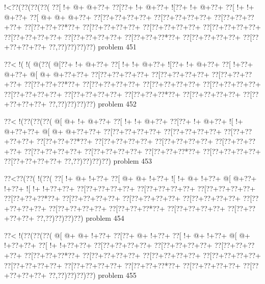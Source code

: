 \vbox{\vbox{\goo
\- !<\0??(\0??(\0??(\0??(
\0??[\- !+\- @+\- @+\0??+
\0??[\0??+\- !+\- @+\0??+
\- ![\0??+\- !+\- @+\0??+
\0??[\- !+\- !+\- @+\0??+
\0??[\- @+\- @+\- @+\0??+
\0??[\0??+\0??+\0??+\0??+
\0??[\0??+\0??+\0??+\0??+
\0??[\0??+\0??+\0??+\0??+
\0??[\0??+\0??+\0??*\0??+
\0??[\0??+\0??+\0??+\0??+
\0??[\0??+\0??+\0??+\0??+
\0??[\0??+\0??+\0??+\0??+
\0??[\0??+\0??+\0??+\0??+
\0??[\0??+\0??+\0??+\0??+
\0??[\0??+\0??+\0??*\0??+
\0??[\0??+\0??+\0??+\0??+
\0??[\0??+\0??+\0??+\0??+
\0??,\0??)\0??)\0??)\0??)
}
\hfil problem 451\hfil\break
}

\vbox{\vbox{\goo
\0??<\- !(\- !(\- @(\0??(
\- @[\0??+\- !+\- @+\0??+
\0??[\- !+\- !+\- @+\0??+
\- ![\0??+\- !+\- @+\0??+
\0??[\- !+\0??+\- @+\0??+
\- @[\- @+\- @+\0??+\0??+
\0??[\0??+\0??+\0??+\0??+
\0??[\0??+\0??+\0??+\0??+
\0??[\0??+\0??+\0??+\0??+
\0??[\0??+\0??+\0??*\0??+
\0??[\0??+\0??+\0??+\0??+
\0??[\0??+\0??+\0??+\0??+
\0??[\0??+\0??+\0??+\0??+
\0??[\0??+\0??+\0??+\0??+
\0??[\0??+\0??+\0??+\0??+
\0??[\0??+\0??+\0??*\0??+
\0??[\0??+\0??+\0??+\0??+
\0??[\0??+\0??+\0??+\0??+
\0??,\0??)\0??)\0??)\0??)
}
\hfil problem 452\hfil\break
}

\vbox{\vbox{\goo
\0??<\- !(\0??(\0??(\0??(
\- @[\- @+\- !+\- @+\0??+
\0??[\- !+\- !+\- @+\0??+
\0??[\0??+\- !+\- @+\0??+
\- ![\- !+\- @+\0??+\0??+
\- @[\- @+\- @+\0??+\0??+
\0??[\0??+\0??+\0??+\0??+
\0??[\0??+\0??+\0??+\0??+
\0??[\0??+\0??+\0??+\0??+
\0??[\0??+\0??+\0??*\0??+
\0??[\0??+\0??+\0??+\0??+
\0??[\0??+\0??+\0??+\0??+
\0??[\0??+\0??+\0??+\0??+
\0??[\0??+\0??+\0??+\0??+
\0??[\0??+\0??+\0??+\0??+
\0??[\0??+\0??+\0??*\0??+
\0??[\0??+\0??+\0??+\0??+
\0??[\0??+\0??+\0??+\0??+
\0??,\0??)\0??)\0??)\0??)
}
\hfil problem 453\hfil\break
}

\vbox{\vbox{\goo
\0??<\0??(\0??(\- !(\0??(
\0??[\- !+\- @+\- !+\0??+
\0??[\- @+\- @+\- !+\0??+
\- ![\- !+\- @+\- !+\0??+
\- @[\- @+\0??+\- !+\0??+
\- ![\- !+\- !+\0??+\0??+
\0??[\0??+\0??+\0??+\0??+
\0??[\0??+\0??+\0??+\0??+
\0??[\0??+\0??+\0??+\0??+
\0??[\0??+\0??+\0??*\0??+
\0??[\0??+\0??+\0??+\0??+
\0??[\0??+\0??+\0??+\0??+
\0??[\0??+\0??+\0??+\0??+
\0??[\0??+\0??+\0??+\0??+
\0??[\0??+\0??+\0??+\0??+
\0??[\0??+\0??+\0??*\0??+
\0??[\0??+\0??+\0??+\0??+
\0??[\0??+\0??+\0??+\0??+
\0??,\0??)\0??)\0??)\0??)
}
\hfil problem 454\hfil\break
}

\vbox{\vbox{\goo
\0??<\- !(\0??(\0??(\0??(
\- @[\- @+\- @+\- !+\0??+
\0??[\0??+\- @+\- !+\0??+
\0??[\- !+\- @+\- !+\0??+
\- @[\- @+\- !+\0??+\0??+
\0??[\- !+\- !+\0??+\0??+
\0??[\0??+\0??+\0??+\0??+
\0??[\0??+\0??+\0??+\0??+
\0??[\0??+\0??+\0??+\0??+
\0??[\0??+\0??+\0??*\0??+
\0??[\0??+\0??+\0??+\0??+
\0??[\0??+\0??+\0??+\0??+
\0??[\0??+\0??+\0??+\0??+
\0??[\0??+\0??+\0??+\0??+
\0??[\0??+\0??+\0??+\0??+
\0??[\0??+\0??+\0??*\0??+
\0??[\0??+\0??+\0??+\0??+
\0??[\0??+\0??+\0??+\0??+
\0??,\0??)\0??)\0??)\0??)
}
\hfil problem 455\hfil\break
}

